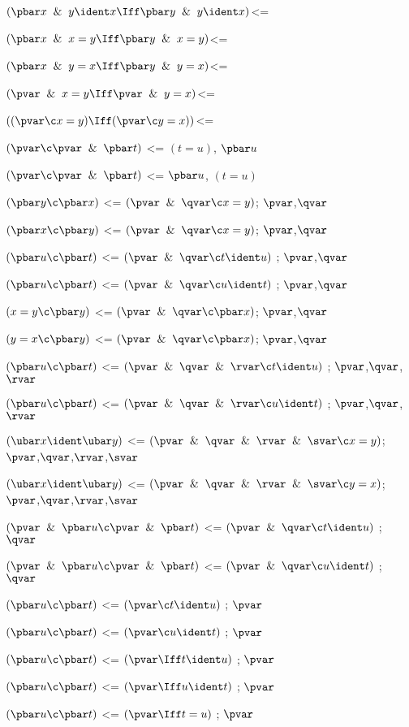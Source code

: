 $(\pbar x \And y \ident x \Iff \pbar y \And y \ident x)$<=

$(\pbar x \And x = y \Iff \pbar y \And x = y)$<=

$(\pbar x \And y = x \Iff \pbar y \And y = x)$<=

$(\pvar \And x = y \Iff \pvar \And y = x)$<=

$((\pvar \c x = y) \Iff (\pvar \c y = x))$<=

$(\pvar \c \pvar \And \pbar t)$ <= $(t = u)$, $\pbar u$ 

$(\pvar \c \pvar \And \pbar t)$ <= $\pbar u$, $(t = u)$

$(\pbar y \c \pbar x)$ <= $(\pvar \And \qvar \c x = y)$; $\pvar$,$\qvar$

$(\pbar x \c \pbar y)$ <= $(\pvar \And \qvar \c x = y)$; $\pvar$,$\qvar$

$(\pbar u \c \pbar t)$ <= $(\pvar\And\qvar \c t \ident u)$ ; $\pvar$,$\qvar$

$(\pbar u \c \pbar t)$ <= $(\pvar\And\qvar \c u \ident t)$ ; $\pvar$,$\qvar$

$(x = y \c \pbar y)$ <= $(\pvar \And \qvar \c \pbar x)$; $\pvar$,$\qvar$

$(y = x \c \pbar y)$ <= $(\pvar \And \qvar \c \pbar x)$; $\pvar$,$\qvar$

$(\pbar u \c \pbar t)$ <= $(\pvar\And\qvar \And \rvar \c t \ident u)$ ; $\pvar$,$\qvar$,$\rvar$

$(\pbar u \c \pbar t)$ <= $(\pvar\And\qvar \And \rvar \c u \ident t)$ ; $\pvar$,$\qvar$,$\rvar$

$(\ubar x \ident \ubar y)$ <= $(\pvar \And \qvar \And \rvar \And \svar \c x=y)$;$\pvar$,$\qvar$,$\rvar$,$\svar$

$(\ubar x \ident \ubar y)$ <= $(\pvar \And \qvar \And \rvar \And \svar \c y=x)$;$\pvar$,$\qvar$,$\rvar$,$\svar$

$(\pvar \And \pbar u \c \pvar \And \pbar t)$ <= $(\pvar\And\qvar \c t \ident u)$ ; $\qvar$

$(\pvar \And \pbar u \c \pvar \And \pbar t)$ <= $(\pvar\And\qvar \c u \ident t)$ ; $\qvar$

$(\pbar u \c \pbar t)$ <= $(\pvar \c t \ident u)$ ; $\pvar$

$(\pbar u \c \pbar t)$ <= $(\pvar \c u \ident t)$ ; $\pvar$

$(\pbar u \c \pbar t)$ <= $(\pvar \Iff t \ident u)$ ; $\pvar$

$(\pbar u \c \pbar t)$ <= $(\pvar \Iff u \ident t)$ ; $\pvar$

$(\pbar u \c \pbar t)$ <= $(\pvar \Iff t = u)$ ; $\pvar$

